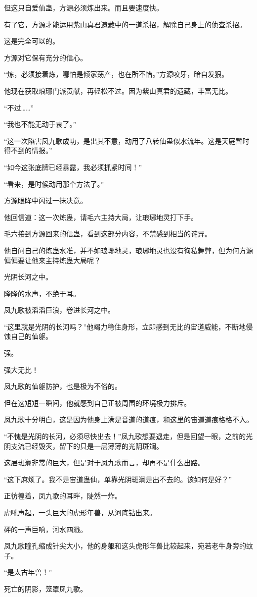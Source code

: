 \begin{this_body}
但这只自爱仙蛊，方源必须炼出来。而且要速度快。

有了它，方源才能运用紫山真君遗藏中的一道杀招，解除自己身上的侦查杀招。

这是完全可以的。

方源对它保有充分的信心。

“炼，必须接着炼，哪怕是倾家荡产，也在所不惜。”方源咬牙，暗自发狠。

他现在获取琅琊门派贡献，再轻松不过。因为紫山真君的遗藏，丰富无比。

“不过……”

“我也不能无动于衷了。”

“这一次陷害凤九歌成功，是出其不意，动用了八转仙蛊似水流年。这是天庭暂时得不到的情报。”

“如今这张底牌已经暴露，我必须抓紧时间！”

“看来，是时候动用那个方法了。”

方源眼眸中闪过一抹决意。

他回信道：这一次炼蛊，请毛六主持大局，让琅琊地灵打下手。

毛六接到方源回来的信蛊，看到这部分内容，不禁感到相当的诧异。

他自问自己的炼蛊水准，并不如琅琊地灵，琅琊地灵也没有徇私舞弊，但为何方源偏偏要让他来主持炼蛊大局呢？

光阴长河之中。

隆隆的水声，不绝于耳。

凤九歌被滔滔巨浪，卷进长河之中。

“这里就是光阴的长河吗？”他竭力稳住身形，立即感到无比的宙道威能，不断地侵蚀自己的仙躯。

强。

强大无比！

凤九歌的仙躯防护，也是极为不俗的。

但在这短短一瞬间，他就感到自己正被周围的环境极力排斥。

凤九歌十分明白，这是因为他身上满是音道的道痕，和这里的宙道道痕格格不入。

“不愧是光阴的长河，必须尽快出去！”凤九歌想要退走，但是回望一眼，之前的光阴支流已经毁灭，留下的只是一层薄薄的光阴斑斓。

这层斑斓非常的巨大，但是对于凤九歌而言，却再不是什么出路。

“这下麻烦了。我不是宙道蛊仙，单靠光阴斑斓是出不去的。该如何是好？”

正彷徨着，凤九歌的耳畔，陡然一炸。

虎吼声起，一头巨大的虎形年兽，从河底钻出来。

砰的一声巨响，河水四溅。

凤九歌瞳孔缩成针尖大小，他的身躯和这头虎形年兽比较起来，宛若老牛身旁的蚊子。

“是太古年兽！”

死亡的阴影，笼罩凤九歌。

\end{this_body}


